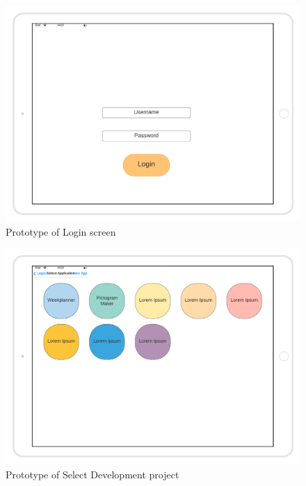 \begin{figure}[H]
    \includegraphics[width=\textwidth]{images/Login-Mockup.png}
    \caption{Prototype of Login screen}
\end{figure}

\begin{figure}[H]
    \includegraphics[width=\textwidth]{images/Select-App-Mockup.png}
    \caption{Prototype of Select Development project}
\end{figure}

